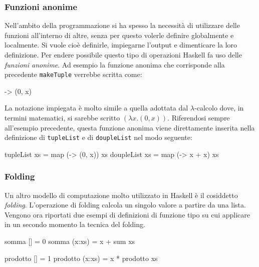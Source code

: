 \subsubsection{Funzioni anonime}
Nell'ambito della programmazione si ha spesso la necessit\`{a} di utilizzare delle funzioni all'interno di altre, senza 
per questo volerle definire globalmente e localmente. Si vuole cio\`e definirle, impiegarne 
l'output e dimenticare la loro definizione. Per endere possibile questo tipo di operazioni Haskell fa uso delle 
\emph{funzioni anonime}. Ad 
esempio la funzione anonima che corrisponde alla precedente 
\verb"makeTuple" verrebbe scritta come:
\begin{haskellCode}
\x -> (0, x)
\end{haskellCode}
La notazione impiegata \`e molto simile a quella 
adottata dal $\lambda$-calcolo dove, in 
termini matematici, si sarebbe scritto $(\lambda x.(0,x))$. Riferendosi sempre all'esempio precedente, 
questa funzione anonima viene direttamente inserita 
nella definizione di \verb"tupleList" e di \verb"doupleList" nel modo seguente:
\begin{haskellCode}
tupleList  xs = map (\x -> (0, x)) xs
doupleList xs = map (\x -> x + x) xs
\end{haskellCode}


\subsubsection{Folding}
Un altro modello di computazione molto utilizzato in Haskell \`e
il cosiddetto \emph{folding}. L'operazione di folding calcola un 
singolo valore a partire da una lista. Vengono ora riportati due esempi di definizioni di 
funzione tipo su cui applicare in un secondo momento la tecnica del 
folding.
%
\begin{haskellCode}
somma []      =  0
somma (x:xs)  =  x + sum xs
\end{haskellCode}

\begin{haskellCode}
prodotto []     = 1
prodotto (x:xs) = x * prodotto xs
\end{haskellCode}

